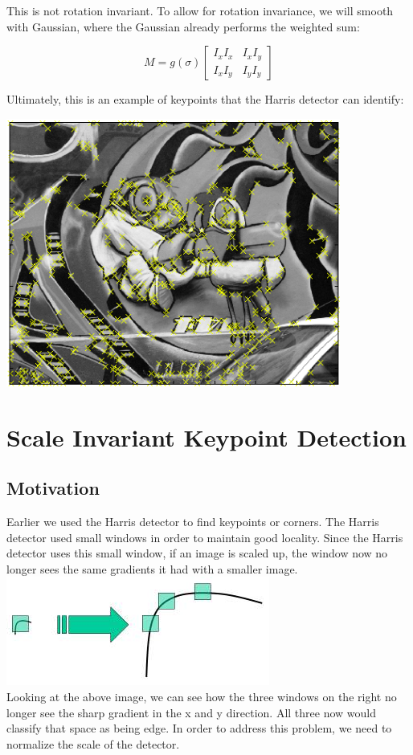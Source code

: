 \documentclass{article}
\begin{document}
This is not rotation invariant. To allow for rotation invariance, we will smooth with Gaussian, where the Gaussian already performs the weighted sum:

\[M =
g( \sigma )
  \begin{bmatrix}
      I_x I_x & I_x I_y\\
      I_x I_y & I_y I_y
    \end{bmatrix}
\]

Ultimately, this is an example of keypoints that the Harris detector can identify:
\begin{center}
	\includegraphics[scale=0.5]{harris_response.png}\\
\end{center}

\section{Scale Invariant Keypoint Detection}
\subsection{Motivation}
Earlier we used the Harris detector to find keypoints or corners. The Harris detector used small windows in order to maintain good locality. Since the Harris detector uses this small window, if an image is scaled up, the window now no longer sees the same gradients it had with a smaller image.\\
\includegraphics{sift_scale_invariant.jpg} \cite{opencv}\\
Looking at the above image, we can see how the three windows on the right no longer see the sharp gradient in the x and y direction. All three now would classify that space as being edge. In order to address this problem, we need to normalize the scale of the detector.
\end{document}
